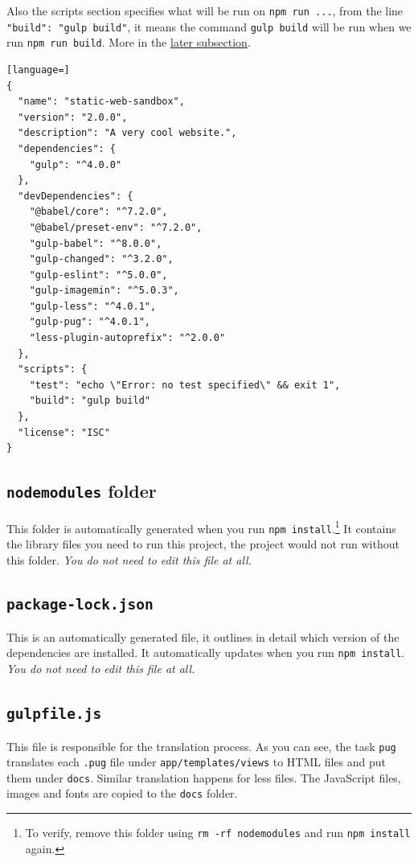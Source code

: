 Also the scripts section specifies what will be run on \texttt{npm run ...}, from the line \texttt{"build": "gulp build"}, it means the command \texttt{gulp build} will be run when we run \texttt{npm run build}. More in the \hyperref[sec:gulpfile]{later subsection}.

\begin{lstlisting}[language=]
{
  "name": "static-web-sandbox",
  "version": "2.0.0",
  "description": "A very cool website.",
  "dependencies": {
    "gulp": "^4.0.0"
  },
  "devDependencies": {
    "@babel/core": "^7.2.0",
    "@babel/preset-env": "^7.2.0",
    "gulp-babel": "^8.0.0",
    "gulp-changed": "^3.2.0",
    "gulp-eslint": "^5.0.0",
    "gulp-imagemin": "^5.0.3",
    "gulp-less": "^4.0.1",
    "gulp-pug": "^4.0.1",
    "less-plugin-autoprefix": "^2.0.0"
  },
  "scripts": {
    "test": "echo \"Error: no test specified\" && exit 1",
    "build": "gulp build"
  },
  "license": "ISC"
}
\end{lstlisting}

\subsection{\texttt{node\textunderscore modules} folder}

This folder is automatically generated when you run \texttt{npm install}.\footnote{To verify, remove this folder using \texttt{rm -rf node\textunderscore modules} and run \texttt{npm install} again.} It contains the library files you need to run this project, the project would not run without this folder. \textit{You do not need to edit this file at all.}

\subsection{\texttt{package-lock.json}}

This is an automatically generated file, it outlines in detail which version of the dependencies are installed. It automatically updates when you run \texttt{npm install}. \textit{You do not need to edit this file at all.}

\subsection{\texttt{gulpfile.js}}
\label{sec:gulpfile}

This file is responsible for the translation process. As you can see, the task \texttt{pug} translates each \texttt{.pug} file under \texttt{app/templates/views} to HTML files and put them under \texttt{docs}. Similar translation happens for less files. The JavaScript files, images and fonts are copied to the \texttt{docs} folder.

